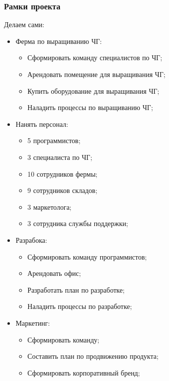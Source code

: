 \documentclass[a4paper,10pt]{article}
\begin{document}
\subsubsection{Рамки проекта}

Делаем сами:

    \begin{itemize}
        \item Ферма по выращиванию ЧГ:
            \begin{itemize}
                \item Сформировать команду специалистов по ЧГ;
                \item Арендовать помещение для выращивания ЧГ;
                \item Купить оборудование для выращивания ЧГ;
                \item Наладить процессы по выращиванию ЧГ;
            \end{itemize}
        \item Нанять персонал:
            \begin{itemize}
                \item 5 программистов;
                \item 3 специалиста по ЧГ;
                \item 10 сотрудников фермы;
                \item 9 сотрудников складов;
                \item 3 маркетолога;
                \item 3 сотрудника службы поддержки;
            \end{itemize}
        \item Разрабока:
            \begin{itemize}
                \item Сформировать команду программистов;
                \item Арендовать офис;
                \item Разработать план по разработке;
                \item Наладить процессы по разработке;
            \end{itemize}
        \item Маркетинг:
            \begin{itemize}
                \item Сформировать команду;
                \item Составить план по продвижению продукта;
                \item Сформировать корпоративный бренд;

\end{itemize}
\end{itemize}
\end{document}
